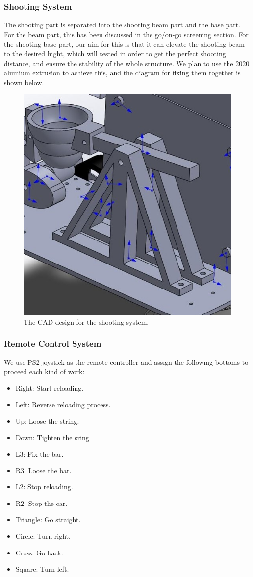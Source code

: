 \documentclass{article}
\begin{document}
\subsubsection*{Shooting System}
The shooting part is separated into the shooting beam part and the base part. For the beam part, this has been discussed in the go/on-go screening section. For the shooting base part, our aim for this is that it can elevate the shooting beam to the desired hight, which will tested in order to get the perfect shooting distance, and ensure the stability of the whole structure. We plan to use the 2020 alumium extrusion to achieve this, and the diagram for fixing them together is shown below.

\begin{figure}[H]
\centering
\includegraphics[width=0.5\linewidth]{Stand1}
\caption{The CAD design for the shooting system.}
\end{figure}

\subsubsection*{Remote Control System}
We use PS2 joystick as the remote controller and assign the following bottoms to proceed each kind of work:\\
\begin{itemize}
\item Right: Start reloading.
\item Left: Reverse reloading process.
\item Up: Loose the string.
\item Down: Tighten the sring
\item L3: Fix the bar.
\item R3: Loose the bar.
\item L2: Stop reloading.
\item R2: Stop the car.
\item Triangle: Go straight.
\item Circle: Turn right.
\item Cross: Go back.
\item Square: Turn left.
\end{itemize}
\end{document}
